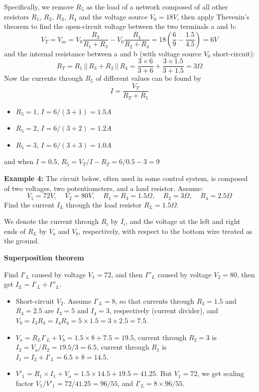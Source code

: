 \begin{itemize}
\begin{itemize}
Specifically, we remove $R_5$ as the load of a network composed of all other
resistors $R_1$, $R_2$, $R_3$, $R_4$ and the voltage source $V_0=18V$, then
apply Thevenin's theorem to find the open-circuit voltage between the two
terminals a and b:
\[	
V_T=V_{oc}=V_0\frac{R_3}{R_1+R_3}-V_0\frac{R_4}{R_2+R_4}
=18 \left(\frac{6}{9}-\frac{1.5}{4.5}\right)=6V 
\]
and the internal resistance between a and b (with voltage source $V_0$ 
short-circuit):
\[ 
R_T=R_1\,||\,R_3+R_2\,||\,R_4
=\frac{3\times 6}{3+6}+\frac{3\times 1.5}{3+1.5}=3\Omega 
\]
Now the currents through $R_5$ of different values can be found by
\[
I=\frac{V_T}{R_T+R_5}
\]
\begin{itemize}
\item $R_5=1$, $I=6/(3+1)=1.5A$
\item $R_5=2$, $I=6/(3+2)=1.2A$
\item $R_5=3$, $I=6/(3+3)=1.0A$
\end{itemize}
and when $I=0.5$, $R_5=V_T/I-R_T=6/0.5-3=9$
\end{itemize}

{\bf Example 4: } The circuit below, often used in some control system, 
is composed of two voltages, two potentiometers, and a load resistor.
Assume:
\[
V_1=72V,\;\;\;\;V_2=80V,\;\;\;\;R_1=R_3=1.5\Omega,\;\;\;\;R_2=3\Omega,
\;\;\;\;R_4=2.5\Omega
\]
Find the current $I_L$ through the load resistor $R_L=1.5\Omega$. 

We denote the current through $R_i$ by $I_i$, and the voltage at the left 
and right ends of $R_L$ by $V_a$ and $V_b$, respectively, with respect to 
the bottom wire treated as the ground.


{\bf Superposition theorem}

Find $I'_L$ caused by voltage $V_1=72$, and then $I''_L$ caused by voltage
$V_2=80$, then get $I_L=I'_L+I''_L$.

\begin{itemize}

\item Short-circuit $V_2$. Assume $I'_L=8$, so that currents through
	$R_3=1.5$ and $R_4=2.5$ are $I_3=5$ and $I_4=3$, respectively
	(current divider), and $V_b=I_3R_3=I_4R_4=5\times 1.5=3\times 2.5=7.5$.
\item $V_a=R_L I'_L+V_b=1.5\times 8+7.5=19.5$, current through $R_2=3$
	is $I_2=V_a/R_2=19.5/3=6.5$, current through $R_1$ is 
	$I_1=I_2+I'_L=6.5+8=14.5$.
\item $V'_1=R_1\times I_1+V_a=1.5\times 14.5+19.5=41.25$. But $V_1=72$,
	we get scaling factor $V_1/V'_1=72/41.25=96/55$, and 
	$I'_L=8 \times 96/55$.


\end{itemize}
\end{itemize}
